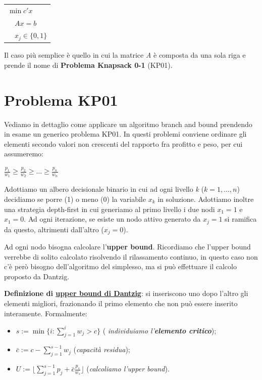 \documentclass[11pt, oneside]{book}
\begin{document}
\begin{center}
\begin{tabular}{l}
$\min{c'x}$ \\
$\quad Ax = b$ \\
$\quad x_j \in \{ 0,1\}$\\
\end{tabular}
\end{center}

Il caso pi\`u semplice \`e quello in cui la matrice {\em A} \`e
composta da una sola riga e prende il nome di {\bf Problema Knapsack
  0-1} (KP01).

\section{Problema KP01}

Vediamo in dettaglio come applicare un algoritmo branch and bound
prendendo in esame un generico problema KP01. In questi problemi
conviene ordinare gli elementi secondo valori non crescenti del
rapporto fra profitto e peso, per cui assumeremo:

\begin{center}
$\frac{p_1}{w_1} \geq \frac{p_2}{w_2} \geq \dots \geq \frac{p_n}{w_n}$  
\end{center}

Adottiamo un albero decisionale binario in cui ad ogni livello {\em k}
($k = 1, \dots, n$) decidiamo se porre (1) o meno (0) la variabile
$x_k$ in soluzione. Adottiamo inoltre una strategia depth-first in cui
generiamo al primo livello i due nodi $x_1=1$ e $x_1 = 0$. Ad ogni
iterazione, se esiste un nodo attivo generato da $x_j=1$ si ramifica
da questo, altrimenti dall'altro ($x_j = 0$).

\par\bigskip

Ad ogni nodo bisogna calcolare l'{\bf upper bound}. Ricordiamo che
l'upper bound verrebbe di solito calcolato risolvendo il rilassamento
continuo, in questo caso non c'\`e per\`o bisogno dell'algoritmo del
simplesso, ma si pu\`o effettuare il calcolo proposto da Dantzig. 

\par\bigskip

{\bf Definizione di \underline{upper bound di Dantzig}}: si
inseriscono uno dopo l'altro gli elementi migliori, frazionando il
primo elemento che non pu\`o essere inserito interamente. Formalmente:

\begin{itemize}
\item $s := \min \{i : \sum\limits_{j=1}^i w_j > c \}$ ({\em
  individuiamo l'{\bf {\em elemento critico}}});
\item $\bar{c} := c-\sum\limits_{j=1}^{s-1}w_j$ ({\em capacit\`a
  residua});
\item $U := \biggr\lfloor \sum\limits_{j=1}^{s-1} p_j +
  \bar{c}\frac{p_s}{w_s}\biggr\rfloor$ ({\em calcoliamo l'upper bound}).
\end{itemize}
\end{document}
